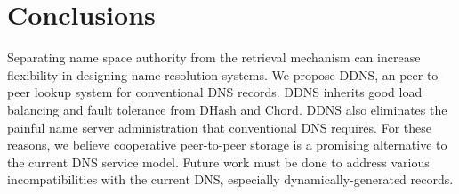 \section{Conclusions}

Separating name space authority from the 
retrieval mechanism can increase flexibility 
in designing name resolution systems. 
We propose DDNS, an peer-to-peer lookup system for
conventional DNS records.
DDNS inherits good load balancing and fault tolerance
from DHash and Chord.
DDNS also eliminates the painful name server administration that
conventional DNS requires.
For these reasons, we believe cooperative peer-to-peer storage is a
promising alternative to the current DNS service model.
Future work must be done to address various
incompatibilities with the current DNS, especially 
dynamically-generated records.
